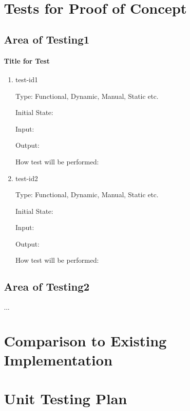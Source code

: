 \documentclass[12pt, titlepage]{article}
\begin{document}
\section{Tests for Proof of Concept}

\subsection{Area of Testing1}
		
\paragraph{Title for Test}

\begin{enumerate}

\item{test-id1\\}

Type: Functional, Dynamic, Manual, Static etc.
					
Initial State: 
					
Input: 
					
Output: 
					
How test will be performed: 
					
\item{test-id2\\}

Type: Functional, Dynamic, Manual, Static etc.
					
Initial State: 
					
Input: 
					
Output: 
					
How test will be performed: 

\end{enumerate}

\subsection{Area of Testing2}

...

	
\section{Comparison to Existing Implementation}	
				
\section{Unit Testing Plan}
		
\end{document}
